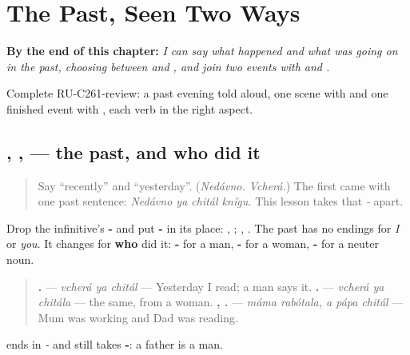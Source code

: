 
\chapter{The Past, Seen Two Ways}
\label{ch:ru-the-past-seen-two-ways}

\begin{chapteropening}
\textbf{By the end of this chapter:} \emph{I can say what happened and what was going on in the past, choosing between  and , and join two events with  and .}

Complete RU-C261-review: a past evening told aloud, one scene with  and one finished event with , each verb in the right aspect.
\end{chapteropening}

\section[\texorpdfstring{\ru{читал}, \ru{читала} … (chitál, chitála …)}{читал, читала … (chitál, chitála …)}]{, ,  — the past, and who did it}

\label{lesson:RU-C261-chital}



\begin{quote}
Say \textquotedblleft{}recently\textquotedblright{} and \textquotedblleft{}yesterday\textquotedblright{}. (\emph{Nedávno. Vcherá.}) The first came with one past sentence: \emph{Nedávno ya chitál knígu.} This lesson takes that \emph{-} apart.
\end{quote}

\begin{grammarlens}[title={Grammar Lens: -\ru{ть} becomes -\ru{л}}]
Drop the infinitive's \textbf{-} and put \textbf{-} in its place: \emph{}, \textbf{}; \emph{}, \textbf{}. The past has no endings for \emph{I} or \emph{you}. It changes for \textbf{who} did it: \textbf{-} for a man, \textbf{-} for a woman, \textbf{-} for a neuter noun.

\begin{quote}
\textbf{  .} — \emph{vcherá ya chitál} — Yesterday I read; a man says it. \textbf{  .} — \emph{vcherá ya chitála} — the same, from a woman. \textbf{ ,   .} — \emph{máma rabótala, a pápa chitál} — Mum was working and Dad was reading.
\end{quote}

\emph{} ends in \emph{-} and still takes \textbf{-}: a father is a man.
\end{grammarlens}

